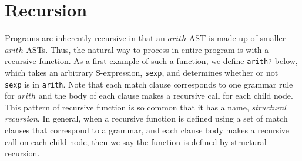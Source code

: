 \documentclass[12pt]{book}
\newcommand{\itm}[1]{\ensuremath{\mathit{#1}}}
\begin{document}



\section{Recursion}
\label{sec:recursion}

Programs are inherently recursive in that an $\itm{arith}$ AST is made
up of smaller $\itm{arith}$ ASTs. Thus, the natural way to process in
entire program is with a recursive function.  As a first example of
such a function, we define \texttt{arith?} below, which takes an
arbitrary S-expression, {\tt sexp}, and determines whether or not {\tt
  sexp} is in {\tt arith}. Note that each match clause corresponds to
one grammar rule for $\itm{arith}$ and the body of each clause makes a
recursive call for each child node. This pattern of recursive function
is so common that it has a name, \emph{structural recursion}.  In
general, when a recursive function is defined using a set of match
clauses that correspond to a grammar, and each clause body makes a
recursive call on each child node, then we say the function is defined
by structural recursion.
\end{document}
